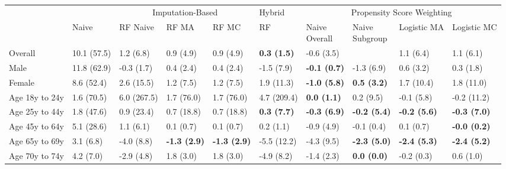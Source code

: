 \documentclass{article} %
\begin{document}
\begin{landscape}
\begin{table}[]
    \centering
\begin{tabular}{llllllllll}
& & \multicolumn{3}{c}{Imputation-Based} & Hybrid & \multicolumn{4}{c}{Propensity Score Weighting} \\
\cline{3-5} \cline{7-10}
            &       Naive & RF Naive & RF MA & RF MC &  RF & \makecell{Naive \\ Overall}  & \makecell{Naive \\ Subgroup} & Logistic MA & Logistic MC \\
\hline
       Overall & 10.1 (57.5) &          1.2 (6.8) &           0.9 (4.9) &           0.9 (4.9) &  \textbf{0.3 (1.5)} &           -0.6 (3.5) &                 &            1.1 (6.4) &            1.1 (6.1) \\
          Male & 11.8 (62.9) &         -0.3 (1.7) &           0.4 (2.4) &           0.4 (2.4) &          -1.5 (7.9) &  \textbf{-0.1 (0.7)} &           -1.3 (6.9) &            0.6 (3.2) &            0.3 (1.8) \\
        Female &  8.6 (52.4) &         2.6 (15.5) &           1.2 (7.5) &           1.2 (7.5) &          1.9 (11.3) &  \textbf{-1.0 (5.8)} &   \textbf{0.5 (3.2)} &           1.7 (10.4) &           1.8 (11.0) \\
Age 18y to 24y &  1.6 (70.5) &        6.0 (267.5) &          1.7 (76.0) &          1.7 (76.0) &         4.7 (209.4) &   \textbf{0.0 (1.1)} &            0.2 (9.5) &           -0.1 (5.8) &          -0.2 (11.2) \\
Age 25y to 44y &  1.8 (47.6) &         0.9 (23.4) &          0.7 (18.8) &          0.7 (18.8) &  \textbf{0.3 (7.7)} &  \textbf{-0.3 (6.9)} &  \textbf{-0.2 (5.4)} &  \textbf{-0.2 (5.6)} &  \textbf{-0.3 (7.0)} \\
Age 45y to 64y &  5.1 (28.6) &          1.1 (6.1) &           0.1 (0.7) &           0.1 (0.7) &           0.2 (1.1) &           -0.9 (4.9) &           -0.1 (0.4) &            0.1 (0.7) &  \textbf{-0.0 (0.2)} \\
Age 65y to 69y &   3.1 (6.8) &         -4.0 (8.8) & \textbf{-1.3 (2.9)} & \textbf{-1.3 (2.9)} &         -5.5 (12.2) &           -4.3 (9.5) &  \textbf{-2.3 (5.0)} &  \textbf{-2.4 (5.3)} &  \textbf{-2.4 (5.2)} \\
Age 70y to 74y &   4.2 (7.0) &         -2.9 (4.8) &           1.8 (3.0) &           1.8 (3.0) &          -4.9 (8.2) &           -1.4 (2.3) &   \textbf{0.0 (0.0)} &           -0.2 (0.3) &            0.6 (1.0) \\

\end{tabular}
\end{table}
\end{landscape}
\end{document}
